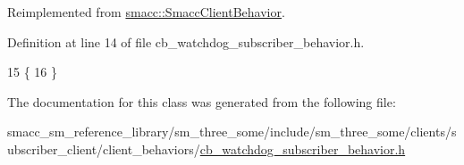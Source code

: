Reimplemented from \hyperlink{classsmacc_1_1SmaccClientBehavior_a7962382f93987c720ad432fef55b123f}{smacc\+::\+Smacc\+Client\+Behavior}.



Definition at line 14 of file cb\+\_\+watchdog\+\_\+subscriber\+\_\+behavior.\+h.


\begin{DoxyCode}
15     \{
16     \}
\end{DoxyCode}


The documentation for this class was generated from the following file\+:\begin{DoxyCompactItemize}
\item 
smacc\+\_\+sm\+\_\+reference\+\_\+library/sm\+\_\+three\+\_\+some/include/sm\+\_\+three\+\_\+some/clients/subscriber\+\_\+client/client\+\_\+behaviors/\hyperlink{cb__watchdog__subscriber__behavior_8h}{cb\+\_\+watchdog\+\_\+subscriber\+\_\+behavior.\+h}\end{DoxyCompactItemize}
